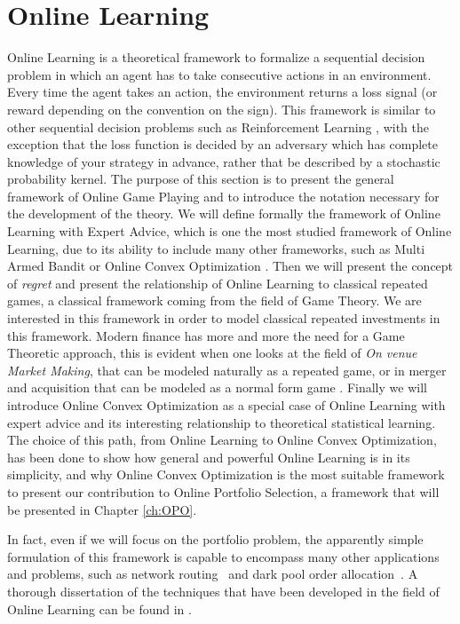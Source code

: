 \chapter{Online Learning}\label{ch:OnlineLearning}
Online Learning is a theoretical framework to formalize a sequential decision problem in which an agent has to take consecutive actions in an environment. Every time the agent takes an action, the environment returns a loss signal (or reward depending on the convention on the sign). This framework is similar to other sequential decision problems such as Reinforcement Learning \cite{sutton1998introduction}, with the exception that the loss function is decided by an adversary which has complete knowledge of your strategy in advance, rather that be described by a stochastic probability kernel. 
The purpose of this section is to present the general framework of Online Game Playing and to introduce the notation necessary for the development of the theory. We will define formally the framework of Online Learning with Expert Advice, which is one the most studied framework of Online Learning, due to its ability to include many other frameworks, such as Multi Armed Bandit \cite{bubeck2012regret} or Online Convex Optimization \cite{hazan2016introduction}.
Then we will present the concept of \emph{regret} and present the relationship of Online Learning to classical repeated games, a classical framework coming from the field of Game Theory. 
We are interested in this framework in order to model classical repeated investments in this framework. 
Modern finance  has more and more the need for a Game Theoretic approach, this is evident when one looks at the field of \emph{On venue Market Making}, that can be modeled naturally as a repeated game, or in merger and acquisition that can be modeled as a normal form game \cite{Yanqing_MaA}. 
Finally we will introduce Online Convex Optimization as a special case of Online Learning with expert advice and its interesting relationship to theoretical statistical learning. The choice of this path, from Online Learning to Online Convex Optimization, has been done to show how general and powerful Online Learning is in its simplicity, and why Online Convex Optimization is the most suitable framework to present our contribution to Online Portfolio Selection, a framework that will be presented in Chapter \ref{ch:OPO}.

In fact, even if we will focus on the portfolio problem, the apparently simple formulation of this framework is capable to encompass many other applications and problems, such as network routing~\cite{belmega2018online} and dark pool order allocation~\cite{agarwal2010optimal}. 
A thorough dissertation of the techniques that have been developed in the field of Online Learning can be found in \cite{cesa2006prediction}.

